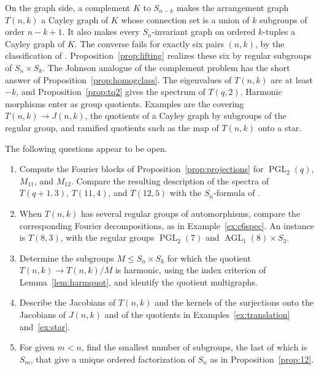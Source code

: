 \documentclass[12pt,letterpaper]{article}
\numberwithin{equation}{section}
\theoremstyle{definition}
\DeclareMathOperator{\agll}{AGL}
\DeclareMathOperator{\pgll}{PGL}
\begin{document}
On the graph side, a complement $K$ to $S_{n-k}$ makes the arrangement graph $T(n,k)$ a Cayley graph of $K$ whose connection set is a union of $k$ subgroups of order $n-k+1$. It also makes every $S_n$-invariant graph on ordered $k$-tuples a Cayley graph of $K$. The converse fails for exactly six pairs $(n,k)$, by the classification of \cite{YFZG21}. Proposition~\ref{prop:lifting} realizes these six by regular subgroups of $S_n\times S_k$. The Johnson analogue of the complement problem has the short answer of Proposition~\ref{prop:homogclass}. The eigenvalues of $T(n,k)$ are at least $-k$, and Proposition~\ref{prop:tq2} gives the spectrum of $T(q,2)$. Harmonic morphisms enter as group quotients. Examples are the covering $T(n,k)\to J(n,k)$, the quotients of a Cayley graph by subgroups of the regular group, and ramified quotients such as the map of $T(n,k)$ onto a star.

The following questions appear to be open.
\begin{enumerate}
\item Compute the Fourier blocks of Proposition~\ref{prop:projections} for $\pgll_2(q)$, $M_{11}$, and $M_{12}$. Compare the resulting description of the spectra of $T(q+1,3)$, $T(11,4)$, and $T(12,5)$ with the $S_n$-formula of \cite{AB16}.
\item When $T(n,k)$ has several regular groups of automorphisms, compare the corresponding Fourier decompositions, as in Example~\ref{ex:c6spec}. An instance is $T(8,3)$, with the regular groups $\pgll_2(7)$ and $\agll_1(8)\times S_3$.
\item Determine the subgroups $M\leq S_n\times S_k$ for which the quotient $T(n,k)\to T(n,k)/M$ is harmonic, using the index criterion of Lemma~\ref{lem:harmquot}, and identify the quotient multigraphs.
\item Describe the Jacobians of $T(n,k)$ and the kernels of the surjections onto the Jacobians of $J(n,k)$ and of the quotients in Examples~\ref{ex:translation} and~\ref{ex:star}.
\item For given $m<n$, find the smallest number of subgroups, the last of which is $S_m$, that give a unique ordered factorization of $S_n$ as in Proposition~\ref{prop:12}.
\end{enumerate}
\end{document}
